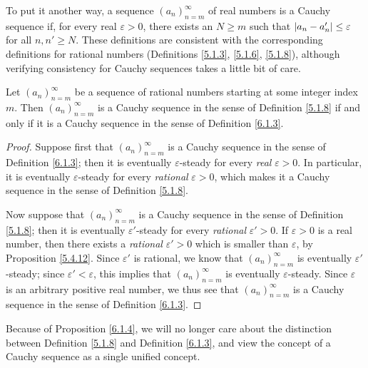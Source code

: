 \begin{note}
    To put it another way, a sequence \((a_n)_{n = m}^\infty\) of real numbers is a Cauchy sequence if, for every real \(\varepsilon > 0\), there exists an \(N \geq m\) such that \(\left\lvert a_n - a_n'\right\rvert \leq \varepsilon\) for all \(n, n' \geq N\).
    These definitions are consistent with the corresponding definitions for rational numbers (Definitions \ref{5.1.3}, \ref{5.1.6}, \ref{5.1.8}), although verifying consistency for Cauchy sequences takes a little bit of care.
\end{note}

\begin{proposition}\label{6.1.4}
    Let \((a_n)_{n = m}^\infty\) be a sequence of rational numbers starting at some integer index \(m\).
    Then \((a_n)_{n = m}^\infty\) is a Cauchy sequence in the sense of Definition \ref{5.1.8} if and only if it is a Cauchy sequence in the sense of Definition \ref{6.1.3}.
\end{proposition}

\begin{proof}
    Suppose first that \((a_n)_{n = m}^\infty\) is a Cauchy sequence in the sense of Definition \ref{6.1.3};
    then it is eventually \(\varepsilon\)-steady for every \emph{real} \(\varepsilon > 0\).
    In particular, it is eventually \(\varepsilon\)-steady for every \emph{rational} \(\varepsilon > 0\), which makes it a Cauchy sequence in the sense of Definition \ref{5.1.8}.

    Now suppose that \((a_n)_{n = m}^\infty\) is a Cauchy sequence in the sense of Definition \ref{5.1.8};
    then it is eventually \(\varepsilon'\)-steady for every \emph{rational} \(\varepsilon' > 0\).
    If \(\varepsilon > 0\) is a real number, then there exists a \emph{rational} \(\varepsilon' > 0\) which is smaller than \(\varepsilon\), by Proposition \ref{5.4.12}.
    Since \(\varepsilon'\) is rational, we know that \((a_n)_{n = m}^\infty\) is eventually \(\varepsilon'\)-steady;
    since \(\varepsilon' < \varepsilon\), this implies that \((a_n)_{n = m}^\infty\) is eventually \(\varepsilon\)-steady.
    Since \(\varepsilon\) is an arbitrary positive real number, we thus see that \((a_n)_{n = m}^\infty\) is a Cauchy sequence in the sense of Definition \ref{6.1.3}.
\end{proof}

\begin{note}
    Because of Proposition \ref{6.1.4}, we will no longer care about the distinction between Definition \ref{5.1.8} and Definition \ref{6.1.3}, and view the concept of a Cauchy sequence as a single unified concept.
\end{note}

